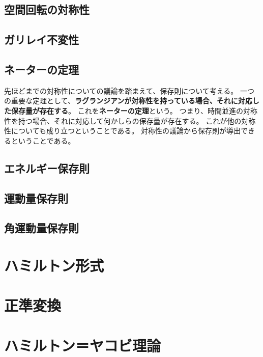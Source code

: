 \documentclass[a4paper]{jsreport}
\begin{document}
        \section{空間回転の対称性}
        \section{ガリレイ不変性}
        \section{ネーターの定理}
            先ほどまでの対称性についての議論を踏まえて、保存則について考える。
            一つの重要な定理として、\textbf{ラグランジアンが対称性を持っている場合、それに対応した保存量が存在する}。
            これを\textbf{ネーターの定理}という。
            つまり、時間並進の対称性を持つ場合、それに対応して何かしらの保存量が存在する。
            これが他の対称性についても成り立つということである。
            対称性の議論から保存則が導出できるということである。

        \section{エネルギー保存則}
        \section{運動量保存則}
        \section{角運動量保存則}

    \chapter{ハミルトン形式}

    \chapter{正準変換}

    \chapter{ハミルトン＝ヤコビ理論}
\end{document}
